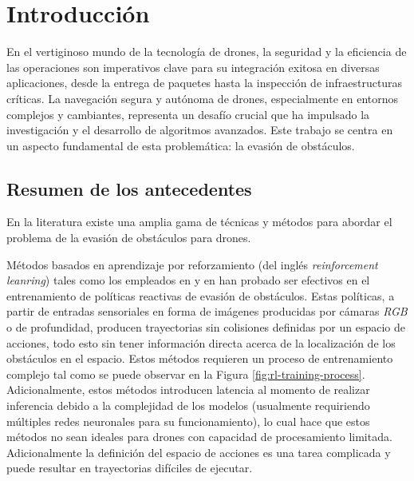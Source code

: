 \chapter{Introducción}
    

    \par En el vertiginoso mundo de la tecnología de drones, la seguridad y la eficiencia de las operaciones son imperativos clave para su integración exitosa en diversas aplicaciones, desde la entrega de paquetes hasta la inspección de infraestructuras críticas. La navegación segura y autónoma de drones, especialmente en entornos complejos y cambiantes, representa un desafío crucial que ha impulsado la investigación y el desarrollo de algoritmos avanzados. Este trabajo se centra en un aspecto fundamental de esta problemática: la evasión de obstáculos.

\section{Resumen de los antecedentes}

    \par En la literatura existe una amplia gama de técnicas y métodos para abordar el problema de la evasión de obstáculos para drones. 
    
    \par Métodos basados en aprendizaje por reforzamiento (del inglés \textit{reinforcement leanring}) tales como los empleados en \cite{Tu2023} y en \cite{Xue2021} han probado ser efectivos en el entrenamiento de políticas reactivas de evasión de obstáculos. Estas políticas, a partir de entradas sensoriales en forma de imágenes producidas por cámaras \textit{RGB} o de profundidad, producen trayectorias sin colisiones definidas por un espacio de acciones, todo esto sin tener información directa acerca de la localización de los obstáculos en el espacio. Estos métodos requieren un proceso de entrenamiento complejo tal como se puede observar en la Figura \ref{fig:rl-training-process}. Adicionalmente, estos métodos introducen latencia al momento de realizar inferencia debido a la complejidad de los modelos (usualmente requiriendo múltiples redes neuronales para su funcionamiento), lo cual hace que estos métodos no sean ideales para drones con capacidad de procesamiento limitada. Adicionalmente la definición del espacio de acciones es una tarea complicada y puede resultar en trayectorias difíciles de ejecutar.

